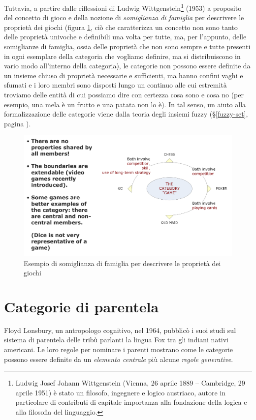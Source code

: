 Tuttavia, a partire dalle riflessioni di Ludwig Wittgenstein\footnote{Ludwig Josef Johann Wittgenstein (Vienna, 26 aprile 1889 – Cambridge, 29 aprile 1951) è stato un filosofo, ingegnere e logico austriaco, autore in particolare di contributi di capitale importanza alla fondazione della logica e alla filosofia del linguaggio.} (1953) a proposito del concetto di gioco e della nozione di \emph{somiglianza di famiglia} per descrivere le proprietà dei giochi (figura \ref{fig:famiglia}, ciò che caratterizza un concetto non sono tanto delle proprietà univoche e definibili una volta per tutte, ma, per l’appunto, delle somiglianze di famiglia, ossia delle proprietà che non sono sempre e tutte presenti in ogni esemplare della categoria che vogliamo definire, ma si distribuiscono in vario modo all’interno della categoria), le categorie non possono essere definite da un insieme chiuso di proprietà necessarie e sufficienti, ma hanno confini vaghi e sfumati e i loro membri sono disposti lungo un continuo alle cui estremità troviamo delle entità di cui possiamo dire con certezza cosa sono e cosa no (per esempio, una mela è un frutto e una patata non lo è). In tal senso, un aiuto alla formalizzazione delle categorie viene dalla teoria degli insiemi fuzzy (\S \ref{fuzzy-set}, pagina \pageref{fuzzy-set}).

\begin{figure}[hbt]
  \centering
  \includegraphics[width=\textwidth]{img/prototype-theory.png}
  \caption{Esempio di somiglianza di famiglia per descrivere le proprietà dei giochi}
  \label{fig:famiglia}
\end{figure}

\section{Categorie di parentela}
Floyd Lonsbury, un antropologo cognitivo, nel 1964, pubblicò i suoi studi sul sistema di parentela delle tribù parlanti la lingua Fox tra gli indiani nativi americani. Le loro regole per nominare i parenti mostrano come le categorie possono essere definite da un \emph{elemento centrale} più alcune \emph{regole generative}.

